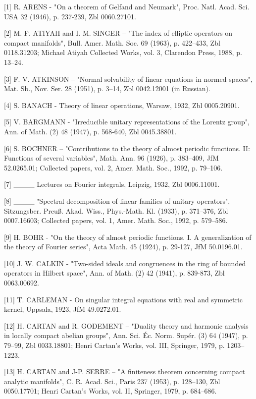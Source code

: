 
{[}1{]} R. ARENS - "On a theorem of Gelfand and Neumark", Proc. Natl. Acad. Sci. USA 32 (1946), p. 237-239, Zbl 0060.27101.

{[}2{]} M. F. ATIYAH and I. M. SINGER -- "The index of elliptic operators on compact manifolds", Bull. Amer. Math. Soc. 69 (1963), p. 422--433, Zbl 0118.31203; Michael Atiyah Collected Works, vol. 3, Clarendon Press, 1988, p. 13--24.

{[}3{]} F. V. ATKINSON -- "Normal solvability of linear equations in normed spaces", Mat. Sb., Nov. Ser. 28 (1951), p. 3--14, Zbl 0042.12001 (in Russian).

{[}4{]} S. BANACH - Theory of linear operations, Warsaw, 1932, Zbl 0005.20901.

{[}5{]} V. BARGMANN - "Irreducible unitary representations of the Lorentz group", Ann. of Math. (2) 48 (1947), p. 568-640, Zbl 0045.38801.

{[}6{]} S. BOCHNER -- "Contributions to the theory of almost periodic functions. II: Functions of several variables", Math. Ann. 96 (1926), p. 383--409, JfM 52.0265.01; Collected papers, vol. 2, Amer. Math. Soc., 1992, p. 79--106.

{[}7{]} \_\_\_\_ Lectures on Fourier integrals, Leipzig, 1932, Zbl 0006.11001.

{[}8{]} \_\_\_\_ "Spectral decomposition of linear families of unitary operators", Sitzungsber. Preuß. Akad. Wiss., Phys.-Math. Kl. (1933), p. 371--376, Zbl 0007.16603; Collected papers, vol. 1, Amer. Math. Soc., 1992, p. 579--586.

{[}9{]} H. BOHR - "On the theory of almost periodic functions. I. A generalization of the theory of Fourier series", Acta Math. 45 (1924), p. 29-127, JfM 50.0196.01.

{[}10{]} J. W. CALKIN - "Two-sided ideals and congruences in the ring of bounded operators in Hilbert space", Ann. of Math. (2) 42 (1941), p. 839-873, Zbl 0063.00692.

{[}11{]} T. CARLEMAN - On singular integral equations with real and symmetric kernel, Uppsala, 1923, JfM 49.0272.01.

{[}12{]} H. CARTAN and R. GODEMENT -- "Duality theory and harmonic analysis in locally compact abelian groups", Ann. Sci. Éc. Norm. Supér. (3) 64 (1947), p. 79--99, Zbl 0033.18801; Henri Cartan's Works, vol. III, Springer, 1979, p. 1203--1223.

{[}13{]} H. CARTAN and J-P. SERRE -- "A finiteness theorem concerning compact analytic manifolds", C. R. Acad. Sci., Paris 237 (1953), p. 128--130, Zbl 0050.17701; Henri Cartan's Works, vol. II, Springer, 1979, p. 684--686.

